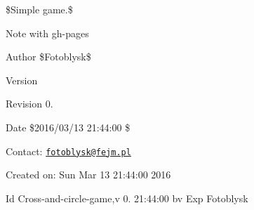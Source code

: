 \$\+Simple game.\$\begin{DoxyNote}{Note}
with gh-\/pages
\end{DoxyNote}
\begin{DoxyAuthor}{Author}
\$\+Fotoblysk\$
\end{DoxyAuthor}
\begin{DoxyVersion}{Version}

\end{DoxyVersion}
\begin{DoxyParagraph}{Revision}
0. 
\end{DoxyParagraph}


\begin{DoxyDate}{Date}
\$2016/03/13 21\+:44\+:00 \$
\end{DoxyDate}
Contact\+: \href{mailto:fotoblysk@fejm.pl}{\tt fotoblysk@fejm.\+pl}

Created on\+: Sun Mar 13 21\+:44\+:00 2016

\begin{DoxyParagraph}{Id}
Cross-\/and-\/circle-\/game,v 0. 21\+:44\+:00 bv Exp Fotoblysk
\end{DoxyParagraph}
